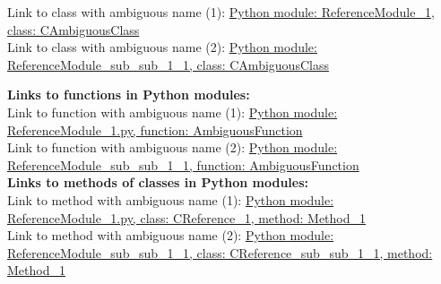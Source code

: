 Link to class with ambiguous name (1): \hyperref[referencepackage-referencemodule-1-cambiguousclass]%
{Python module: ReferenceModule\_1, class: CAmbiguousClass}\\

Link to class with ambiguous name (2): \hyperref[referencepackage-sub-1-subsub-1-1-referencemodule-sub-sub-1-1-cambiguousclass]%
{Python module: ReferenceModule\_sub\_sub\_1\_1, class: CAmbiguousClass}\\

\newpage

\textbf{Links to functions in Python modules:}\\

Link to function with ambiguous name (1): \hyperref[referencepackage-referencemodule-1-ambiguousfunction]{Python module: ReferenceModule\_1.py, function: AmbiguousFunction}\\

Link to function with ambiguous name (2): \hyperref[referencepackage-sub-1-subsub-1-1-referencemodule-sub-sub-1-1-ambiguousfunction]%
{Python module: ReferenceModule\_sub\_sub\_1\_1, function: AmbiguousFunction}\\

\textbf{Links to methods of classes in Python modules:}\\

Link to method with ambiguous name (1): \hyperref[referencepackage-referencemodule-1-creference-1-method-1]%
{Python module: ReferenceModule\_1.py, class: CReference\_1, method: Method\_1}\\

Link to method with ambiguous name (2): \hyperref[referencepackage-sub-1-subsub-1-1-referencemodule-sub-sub-1-1-creference-sub-sub-1-1-method-1]%
{Python module: ReferenceModule\_sub\_sub\_1\_1, class: CReference\_sub\_sub\_1\_1, method: Method\_1}\\

